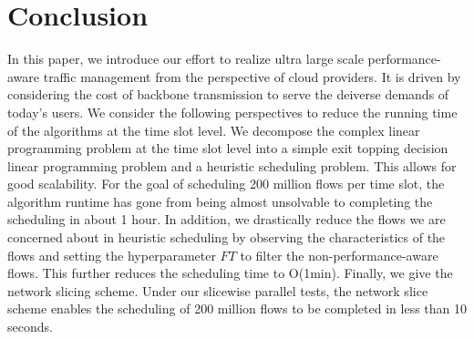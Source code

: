 \section{Conclusion}
In this paper, we introduce our effort to realize ultra large scale performance-aware traffic management from the perspective of cloud providers. It is driven by considering the cost of backbone transmission to serve the deiverse demands of today’s users. We consider the following perspectives to reduce the running time of the algorithms at the time slot level. We decompose the complex linear programming problem at the time slot level into a simple exit topping decision linear programming problem and a heuristic scheduling problem. This allows {\sys} for good scalability. For the goal of scheduling 200 million flows per time slot, the algorithm runtime has gone from being almost unsolvable to completing the scheduling in about 1 hour. In addition, we drastically reduce the flows we are concerned about in heuristic scheduling by observing the characteristics of the flows and setting the hyperparameter $FT$ to filter the non-performance-aware flows. This further reduces the scheduling time to O(1min). Finally, we give the network slicing scheme. Under our slicewise parallel tests, the network slice scheme enables the scheduling of 200 million flows to be completed in less than 10 seconds.

